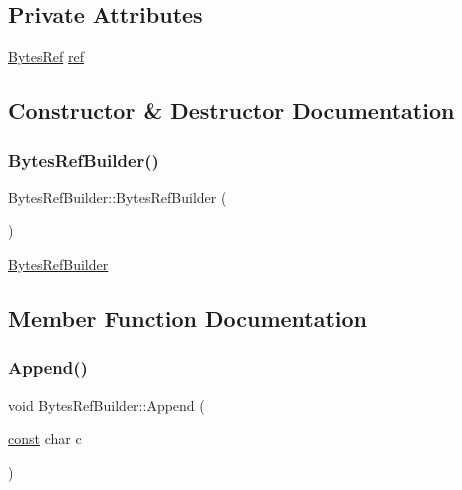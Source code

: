 \subsection*{Private Attributes}
\begin{DoxyCompactItemize}
\item 
\mbox{\hyperlink{classlucene_1_1core_1_1util_1_1BytesRef}{Bytes\+Ref}} \mbox{\hyperlink{classlucene_1_1core_1_1util_1_1BytesRefBuilder_ad6f2fc3362182886584f9c3a5fcb9a56}{ref}}
\end{DoxyCompactItemize}


\subsection{Constructor \& Destructor Documentation}
\mbox{\label{classlucene_1_1core_1_1util_1_1BytesRefBuilder_aa5856f8432f1ec902dec8878870172a1}} 
\subsubsection{\texorpdfstring{Bytes\+Ref\+Builder()}{BytesRefBuilder()}}
{\footnotesize\ttfamily Bytes\+Ref\+Builder\+::\+Bytes\+Ref\+Builder (\begin{DoxyParamCaption}{ }\end{DoxyParamCaption})}

\mbox{\hyperlink{classlucene_1_1core_1_1util_1_1BytesRefBuilder}{Bytes\+Ref\+Builder}} 

\subsection{Member Function Documentation}
\mbox{\label{classlucene_1_1core_1_1util_1_1BytesRefBuilder_a8bd34d12e0ae6cac0ae2e44d6c127102}} 
\subsubsection{\texorpdfstring{Append()}{Append()}\hspace{0.1cm}{\footnotesize\ttfamily [1/4]}}
{\footnotesize\ttfamily void Bytes\+Ref\+Builder\+::\+Append (\begin{DoxyParamCaption}\item[{\mbox{\hyperlink{ZlibCrc32_8h_a2c212835823e3c54a8ab6d95c652660e}{const}} char}]{c }\end{DoxyParamCaption})}

